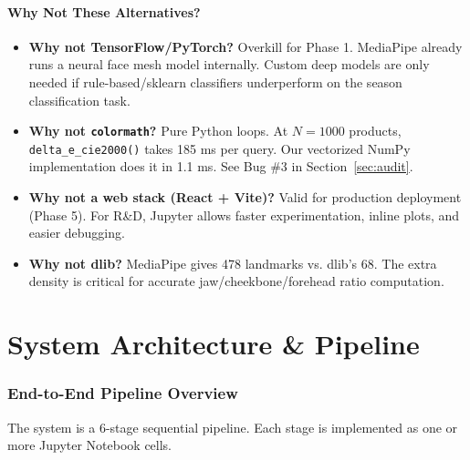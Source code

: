 \documentclass[12pt,a4paper]{article}
\begin{document}
\subsection{Why Not These Alternatives?}

\begin{itemize}
    \item \textbf{Why not TensorFlow/PyTorch?} Overkill for Phase 1. MediaPipe already runs a neural face mesh model internally. Custom deep models are only needed if rule-based/sklearn classifiers underperform on the season classification task.
    \item \textbf{Why not \texttt{colormath}?} Pure Python loops. At $N{=}1000$ products, \texttt{delta\_e\_cie2000()} takes 185 ms per query. Our vectorized NumPy implementation does it in 1.1 ms. See Bug \#3 in Section~\ref{sec:audit}.
    \item \textbf{Why not a web stack (React + Vite)?} Valid for production deployment (Phase 5). For R\&D, Jupyter allows faster experimentation, inline plots, and easier debugging.
    \item \textbf{Why not dlib?} MediaPipe gives 478 landmarks vs. dlib's 68. The extra density is critical for accurate jaw/cheekbone/forehead ratio computation.
\end{itemize}


\part{System Architecture \& Pipeline}

\section{End-to-End Pipeline Overview}

The system is a 6-stage sequential pipeline. Each stage is implemented as one or more Jupyter Notebook cells.
\end{document}
